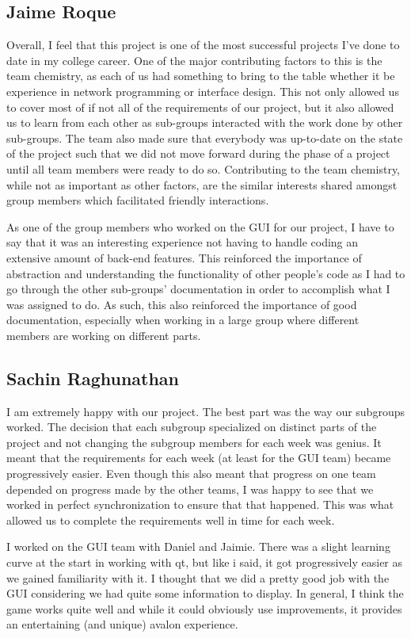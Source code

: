 \documentclass{hitec}
\begin{document}
\subsection{Jaime Roque}
Overall, I feel that this project is one of the most successful projects I’ve done to date in my college career. One of the major contributing factors to this is the team chemistry, as each of us had something to bring to the table whether it be experience in network programming or interface design. This not only allowed us to cover most of if not all of the requirements of our project, but it also allowed us to learn from each other as sub-groups interacted with the work done by other sub-groups. The team also made sure that everybody was up-to-date on the state of the project such that we did not move forward during the phase of a project until all team members were ready to do so. Contributing to the team chemistry, while not as important as other factors, are the similar interests shared amongst group members which facilitated friendly interactions. 

As one of the group members who worked on the GUI for our project, I have to say that it was an interesting experience not having to handle coding an extensive amount of back-end features. This reinforced the importance of abstraction and understanding the functionality of other people’s code as I had to go through the other sub-groups’ documentation in order to accomplish what I was assigned to do. As such, this also reinforced the importance of good documentation, especially when working in a large group where different members are working on different parts.
\subsection{Sachin Raghunathan}
I am extremely happy with our project. The best part was the way our subgroups worked. The decision that each subgroup specialized on distinct parts of the project and not changing the subgroup members for each week was genius. It meant that the requirements for each week (at least for the GUI team) became progressively easier. Even though this also meant that progress on one team depended on progress made by the other teams, I was happy to see that we worked in perfect synchronization to ensure that that happened. This was what allowed us to complete the requirements well in time for each week.

I worked on the GUI team with Daniel and Jaimie. There was a slight learning curve at the start in working with qt, but like i said, it got progressively easier as we gained familiarity with it. I thought that we did a pretty good job with the GUI considering we had quite some information to display. In general, I think the game works quite well and while it could obviously use improvements, it provides an entertaining (and unique) avalon experience.
\end{document}
